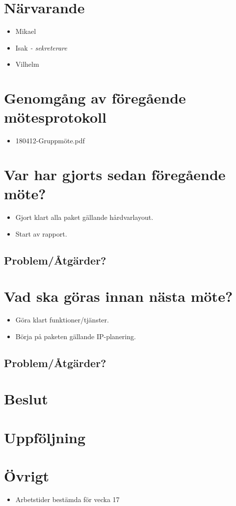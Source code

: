 
\section*{Närvarande}
\begin{itemize}[noitemsep]
    \item Mikael
    \item Isak \textit{- sekreterare}
    \item Vilhelm
\end{itemize}

\section*{Genomgång av föregående mötesprotokoll}
\begin{itemize}[noitemsep]
    \item 180412-Gruppmöte.pdf
\end{itemize}

\section*{Var har gjorts sedan föregående möte?}
\begin{itemize}[noitemsep]
    \item Gjort klart alla paket gällande hårdvarlayout.
    \item Start av rapport.
\end{itemize}

\subsection*{Problem/Åtgärder?}

\section*{Vad ska göras innan nästa möte?}
\begin{itemize}[noitemsep]
	\item Göra klart funktioner/tjänster.
	\item Börja på paketen gällande IP-planering.
\end{itemize}
\subsection*{Problem/Åtgärder?}

\section*{Beslut}

\section*{Uppföljning}

\newpage

\section*{Övrigt}
\begin{itemize}
	\item Arbetstider bestämda för vecka 17
\end{itemize}
